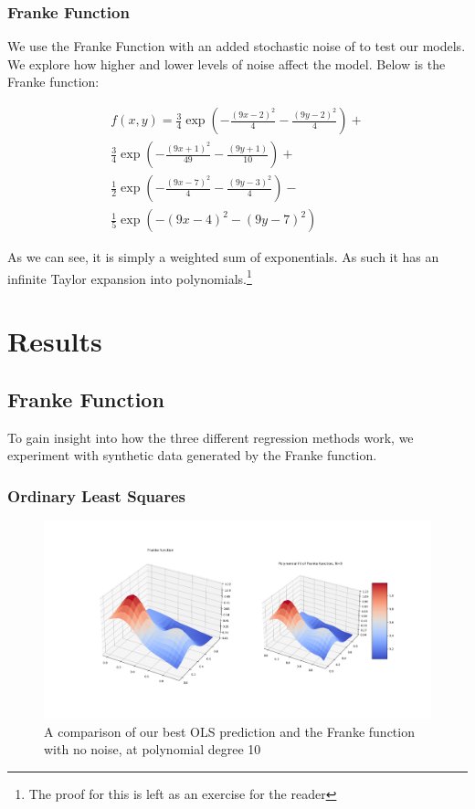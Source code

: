 \documentclass[twocolumn,10pt,cleanfoot]{asme2ej}
\begin{document}
\subsubsection{Franke Function}

We use the Franke Function with an added stochastic noise of to test our models. We explore how higher and lower levels of noise affect the model. Below is the Franke function:

\begin{multline}
f(x,y) = \frac{3}{4}\exp{\left(-\frac{(9x-2)^2}{4}-\frac{(9y-2)^2}{4}\right)} + \\ \frac{3}{4}\exp{\left(-\frac{(9x+1)^2}{49}-\frac{(9y+1)}{10}\right)} + \\
\frac{1}{2}\exp{\left(-\frac{(9x-7)^2}{4}-\frac{(9y-3)^2}{4}\right)} - \\
\frac{1}{5}\exp{\left(-(9x-4)^2-(9y-7)^2\right)}
\end{multline}

As we can see, it is simply a weighted sum of exponentials. As such it has an infinite Taylor expansion into polynomials.\footnote{The proof for this is left as an exercise for the reader}


\section{Results}

\subsection{Franke Function}

To gain insight into how the three different regression methods work, we experiment with synthetic data generated by the Franke function.

\subsubsection{Ordinary Least Squares}

\begin{figure} 
\centerline{\includegraphics[width=6.85in]{figure/frankenonoise.png}}
\caption{A comparison of our best OLS prediction and the Franke function with no noise, at polynomial degree 10}
\label{frankenonoise}
\end{figure}
\end{document}
